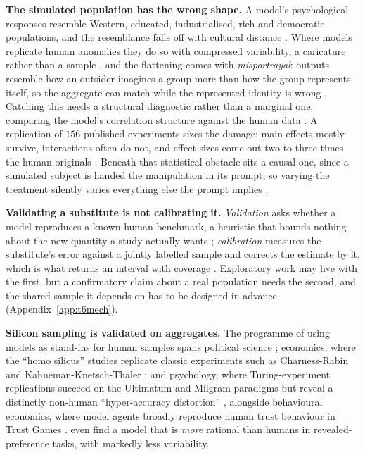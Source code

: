 \documentclass[11pt]{article}
\begin{document}
\textbf{The simulated population has the wrong shape.} A model's psychological
responses resemble Western, educated, industrialised, rich and democratic
populations, and the resemblance falls off with cultural distance
\cite{atari2023which,henrich2010weirdest}. Where models replicate human anomalies
they do so with compressed variability, a caricature rather than a sample
\cite{aher2023turing,mei2024behavioral}, and the flattening comes with
\emph{misportrayal}: outputs resemble how an outsider imagines a group more than
how the group represents itself, so the aggregate can match while the
represented identity is wrong \cite{wang2025misportray}. Catching this needs a
structural diagnostic rather than a marginal one, comparing the model's
correlation structure against the human data \cite{li2025silicon}. A replication
of $156$ published experiments sizes the damage: main effects mostly survive,
interactions often do not, and effect sizes come out two to three times the human
originals \cite{cui2024replace}. Beneath that statistical obstacle sits a causal
one, since a simulated subject is handed the manipulation in its prompt, so
varying the treatment silently varies everything else the prompt implies
\cite{gui2023causal}.

\label{app:t5calib}

\textbf{Validating a substitute is not calibrating it.} \emph{Validation} asks
whether a model reproduces a known human benchmark, a heuristic that bounds
nothing about the new quantity a study actually wants \cite{hullman2025human};
\emph{calibration} measures the substitute's error against a jointly labelled
sample and corrects the estimate by it, which is what returns an interval with
coverage \cite{angelopoulos2023ppi}. Exploratory work may live with the first,
but a confirmatory claim about a real population needs the second, and the shared
sample it depends on has to be designed in advance
(Appendix~\ref{app:t6mech}).

\textbf{Silicon sampling is validated on aggregates.} The programme of using
models as stand-ins for human samples spans political science
\cite{argyle2023out}; economics, where the ``homo silicus'' studies replicate
classic experiments such as Charness-Rabin and Kahneman-Knetsch-Thaler
\cite{horton2023homo}; and psychology, where Turing-experiment replications
succeed on the Ultimatum and Milgram paradigms but reveal a distinctly
non-human ``hyper-accuracy distortion'' \cite{aher2023turing}, alongside
behavioural economics, where model agents broadly reproduce human trust
behaviour in Trust Games \cite{xie2024trust}. \citet{chen2023emergence} even
find a model that is \emph{more} rational than humans in revealed-preference
tasks, with markedly less variability.
\end{document}

